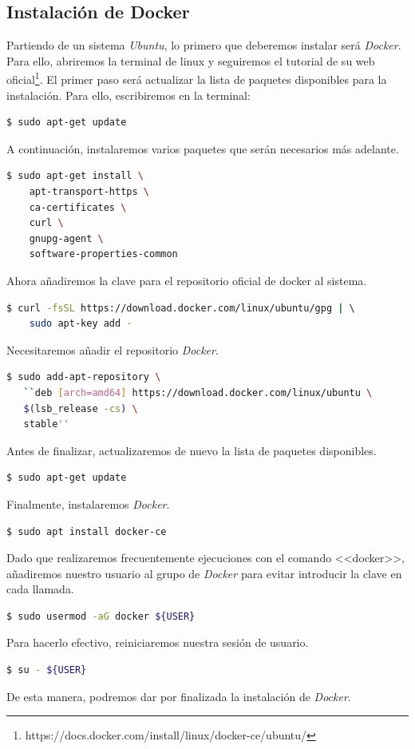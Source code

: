 \subsection{Instalación de Docker}
Partiendo de un sistema \textit{Ubuntu}, lo primero que deberemos instalar será \textit{Docker}. Para ello, abriremos la terminal de linux y seguiremos el tutorial de su web oficial\footnote{https://docs.docker.com/install/linux/docker-ce/ubuntu/}. El primer paso será actualizar la lista de paquetes disponibles para la instalación. Para ello, escribiremos en la terminal:
    \begin{lstlisting}[language=bash]
    $ sudo apt-get update
    \end{lstlisting}
A continuación, instalaremos varios paquetes que serán necesarios más adelante.
    \begin{lstlisting}[language=bash]
    $ sudo apt-get install \
    apt-transport-https \
    ca-certificates \
    curl \
    gnupg-agent \
    software-properties-common
    \end{lstlisting}
Ahora añadiremos la clave para el repositorio oficial de docker al sistema.
    \begin{lstlisting}[language=bash]
    $ curl -fsSL https://download.docker.com/linux/ubuntu/gpg | \ 
    sudo apt-key add -
    \end{lstlisting}
Necesitaremos añadir el repositorio \textit{Docker}.
    \begin{lstlisting}[language=bash]
    $ sudo add-apt-repository \
   ``deb [arch=amd64] https://download.docker.com/linux/ubuntu \
   $(lsb_release -cs) \
   stable''
    \end{lstlisting}
Antes de finalizar, actualizaremos de nuevo la lista de paquetes disponibles.
    \begin{lstlisting}[language=bash]
    $ sudo apt-get update
    \end{lstlisting}
Finalmente, instalaremos \textit{Docker}.
    \begin{lstlisting}[language=bash]
    $ sudo apt install docker-ce
    \end{lstlisting}
Dado que realizaremos frecuentemente ejecuciones con el comando <<docker>>, añadiremos nuestro usuario al grupo de \textit{Docker} para evitar introducir la clave en cada llamada.
    \begin{lstlisting}[language=bash]
    $ sudo usermod -aG docker ${USER}
    \end{lstlisting}
Para hacerlo efectivo, reiniciaremos nuestra sesión de usuario.
    \begin{lstlisting}[language=bash]
    $ su - ${USER}
    \end{lstlisting}
De esta manera, podremos dar por finalizada la instalación de \textit{Docker}.
